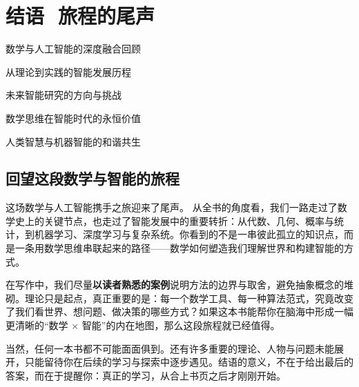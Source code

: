 \chapter*{ 结语\,\, 旅程的尾声}
 \begin{introduction}
  \item 数学与人工智能的深度融合回顾
  \item 从理论到实践的智能发展历程
  \item 未来智能研究的方向与挑战
  \item 数学思维在智能时代的永恒价值
  \item 人类智慧与机器智能的和谐共生
\end{introduction}

\section*{回望这段数学与智能的旅程}

这场数学与人工智能携手之旅迎来了尾声。  
从全书的角度看，我们一路走过了数学史上的关键节点，也走过了智能发展中的重要转折：从代数、几何、概率与统计，到机器学习、深度学习与复杂系统。你看到的不是一串彼此孤立的知识点，而是一条用数学思维串联起来的路径——数学如何塑造我们理解世界和构建智能的方式。

在写作中，我们尽量\textbf{以读者熟悉的案例}说明方法的边界与取舍，避免抽象概念的堆砌。理论只是起点，真正重要的是：每一个数学工具、每一种算法范式，究竟改变了我们看世界、想问题、做决策的哪些方式？如果这本书能帮你在脑海中形成一幅更清晰的“数学 × 智能”的内在地图，那么这段旅程就已经值得。

当然，任何一本书都不可能面面俱到。还有许多重要的理论、人物与问题未能展开，只能留待你在后续的学习与探索中逐步遇见。结语的意义，不在于给出最后的答案，而在于提醒你：真正的学习，从合上书页之后才刚刚开始。

%

%


